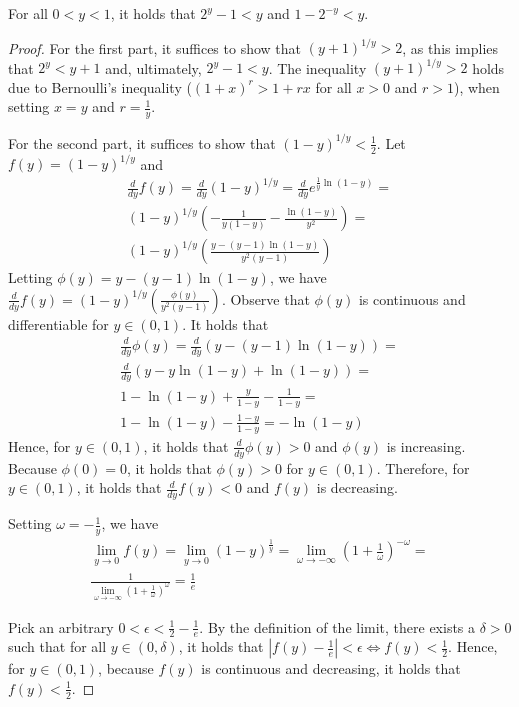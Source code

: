 \begin{lemma} \label{lem:bernoulli}
  For all $0 < y < 1$, it holds that $2^y - 1 < y$
  and $1 - 2^{-y} < y$.
\end{lemma}
\begin{proof}
  For the first part,
  it suffices to show that $(y + 1)^{1/y} > 2$,
  as this implies that $2^y < y + 1$ and, ultimately, $2^y - 1 < y$.
  The inequality $(y + 1)^{1/y} > 2$ holds due to Bernoulli's
  inequality ($(1 + x)^r > 1 + rx$ for all $x > 0$ and $r > 1$),
  when setting $x = y$ and $r = \frac{1}{y}$.

  For the second part,
  it suffices to show that $(1 - y)^{1/y} < \frac{1}{2}$.
  Let $f(y) = (1 - y)^{1/y}$ and
  \begin{align*}
    \frac{d}{dy} f(y) = \frac{d}{dy} (1 - y)^{1/y} = \frac{d}{dy} e^{\frac{1}{y}\ln(1 - y)} =\\
    (1 - y)^{1/y} \left(-\frac{1}{y (1 - y)} - \frac{\ln(1 - y)}{y^2}\right) =\\
    (1 - y)^{1/y} \left(\frac{y - (y - 1) \ln(1 - y)}{y^2(y - 1)}\right)
  \end{align*}
  Letting $\phi(y) = y - (y - 1) \ln(1 - y)$, we have
  $\frac{d}{dy} f(y) = (1 - y)^{1/y} \left(\frac{\phi(y)}{y^2(y - 1)}\right)$.
  Observe that $\phi(y)$ is continuous and differentiable for $y \in (0, 1)$.
  It holds that
  \begin{align*}
    \frac{d}{dy} \phi(y) = \frac{d}{dy} (y - (y - 1) \ln(1 - y)) =\\
    \frac{d}{dy} (y - y \ln(1 - y) + \ln(1 - y)) =\\
    1 - \ln(1 - y) + \frac{y}{1 - y} - \frac{1}{1 - y} =\\
    1 - \ln(1 - y) - \frac{1 - y}{1 - y} = -\ln(1 - y)
  \end{align*}
  Hence, for $y \in (0, 1)$, it holds that $\frac{d}{dy} \phi(y) > 0$ and
  $\phi(y)$ is increasing. Because $\phi(0) = 0$,
  it holds that $\phi(y) > 0$ for $y \in (0, 1)$.
  Therefore, for $y \in (0, 1)$, it holds that $\frac{d}{dy} f(y) < 0$
  and $f(y)$ is decreasing.

  Setting $\omega = - \frac{1}{y}$, we have
  \begin{align*}
    \lim_{y \to 0}f(y) = \lim_{y \to 0}(1 - y)^{\frac{1}{y}} = \lim_{\omega \to -\infty}\left(1 + \frac{1}{\omega}\right)^{-\omega} =\\
    \frac{1}{\lim_{\omega \to -\infty}\left(1 + \frac{1}{\omega}\right)^{\omega}} = \frac{1}{e}
  \end{align*}

  Pick an arbitrary $0 < \epsilon < \frac{1}{2} - \frac{1}{e}$. By the definition of the limit,
  there exists a $\delta > 0$ such that for all $y \in (0, \delta)$, it holds that
  $|f(y) - \frac{1}{e}| <  \epsilon \Leftrightarrow f(y) < \frac{1}{2}$.
  Hence, for $y \in (0, 1)$, because $f(y)$ is continuous and decreasing, it holds that
  $f(y) < \frac{1}{2}$.
  \Qed
\end{proof}

